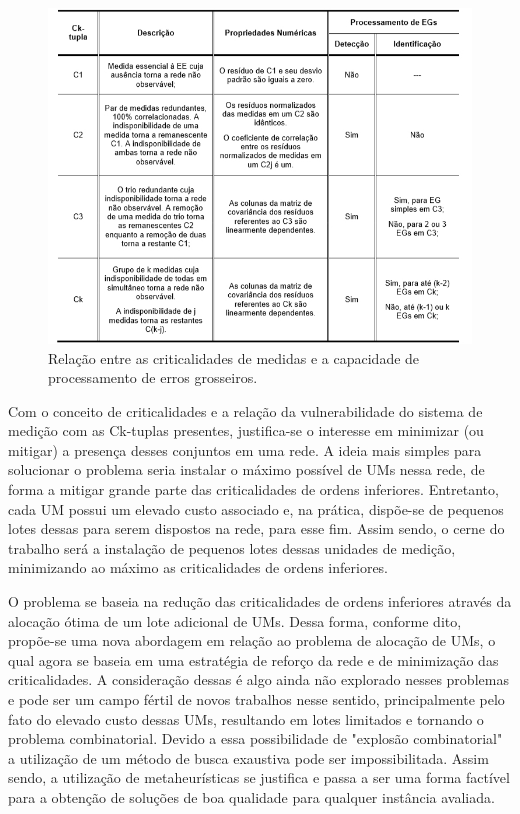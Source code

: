 \documentclass[12pt]{article}
\begin{document}
\begin{figure}[H]
	\centering 
	\includegraphics[scale=0.8]{figuras/Criticalidades-med.jpg}
	\caption{Relação entre as criticalidades de medidas e a  capacidade de processamento de erros grosseiros.\cite{AbelTese16}}
	\label{fig1} %
\end{figure}

Com o conceito de criticalidades e a relação da vulnerabilidade do sistema de medição com as Ck-tuplas presentes, justifica-se o interesse em minimizar (ou mitigar) a presença desses conjuntos em uma rede. A ideia mais simples para solucionar o problema seria instalar o máximo possível de UMs nessa rede, de forma a mitigar grande parte das criticalidades de ordens inferiores. Entretanto, cada UM possui um elevado custo associado e, na prática, dispõe-se de pequenos lotes dessas para serem dispostos na rede, para esse fim. Assim sendo, o cerne do trabalho será a instalação de pequenos lotes dessas unidades de medição, minimizando ao máximo as criticalidades de ordens inferiores.

O problema se baseia na redução das criticalidades de ordens inferiores através da alocação ótima de um lote adicional de UMs. Dessa forma, conforme dito, propõe-se uma nova abordagem em relação ao problema de alocação de UMs, o qual agora se baseia em uma estratégia de reforço da rede e de minimização das criticalidades. A consideração dessas é algo ainda não explorado nesses problemas e pode ser um campo fértil de novos trabalhos nesse sentido, principalmente pelo fato do elevado custo dessas UMs, resultando em lotes limitados e tornando o problema combinatorial. Devido a essa possibilidade de "explosão combinatorial" a utilização de um método de busca exaustiva pode ser impossibilitada. Assim sendo, a utilização de metaheurísticas se justifica e passa a ser uma forma factível para a obtenção de soluções de boa qualidade para qualquer instância avaliada.
\end{document}
